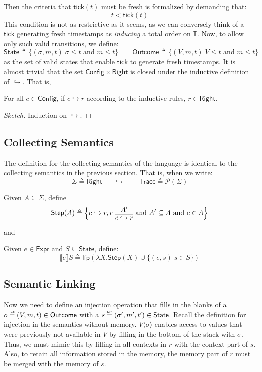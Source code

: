 \documentclass[acmsmall,screen,review]{acmart}\settopmatter{printfolios=true,printccs=false,printacmref=false}
\theoremstyle{acmdefinition}
\newcommand*{\pset}{\mathcal{P}}
\newcommand*{\Expr}{\mathsf{Expr}}
\newcommand*{\Time}{\mathbb{T}}
\newcommand*{\ctx}{\sigma}
\newcommand*{\mem}{m}
\newcommand*{\Trace}{\mathsf{Trace}}
\newcommand*{\Config}{\mathsf{Config}}
\newcommand*{\config}{c}
\newcommand*{\Right}{\mathsf{Right}}
\newcommand*{\rightst}{r}
\newcommand*{\texteq}[1]{\stackrel{\mathclap{\tiny\normalfont\mbox{#1}}}{=}}
\newcommand*{\State}{\mathsf{State}}
\newcommand*{\Outcome}{\mathsf{Outcome}}
\newcommand*{\lfp}{\mathsf{lfp}}
\newcommand*{\semarrow}{\hookrightarrow}
\newcommand*{\sembracket}[1]{\lBrack{#1}\rBrack}
\newcommand*{\tick}{\mathsf{tick}}
\newcommand*{\inject}[2]{{#2}\langle{#1}\rangle}
\begin{document}
Then the criteria that $\tick(t)$ must be fresh is formalized by demanding that:
\[t < \tick(t)\]
This condition is not as restrictive as it seems, as we can conversely think of a $\tick$ generating fresh timestamps as \emph{inducing} a total order on $\Time$.
Now, to allow only such valid transitions, we define:
\[
  \State\triangleq\{(\ctx,\mem,t)|\ctx\le t\text{ and }\mem\le t\}\qquad
  \Outcome\triangleq\{(V,\mem,t)|V\le t\text{ and }\mem\le t\}
\]
as the set of valid states that enable $\tick$ to generate fresh timestamps.
It is almost trivial that the set $\Config\times\Right$ is closed under the inductive definition of $\semarrow$.
That is,
\begin{lemma}
  For all $\config\in\Config$, if $\config\semarrow\rightst$ according to the inductive rules, $\rightst\in\Right$.
\end{lemma}
\begin{proof}[Sketch]
  Induction on $\semarrow$.
\end{proof}

\subsection{Collecting Semantics}
The definition for the collecting semantics of the language is identical to the collecting semantics in the previous section.
That is, when we write:
\[\Sigma\triangleq\Right\:+\:\semarrow\qquad\Trace\triangleq\pset(\Sigma)\]
\begin{definition}
  Given $A\subseteq \Sigma$, define
  \[
    \mathsf{Step}(A)\triangleq
    \left\{\config\semarrow\rightst, \rightst\middle|
    \begin{prooftree}[center=true]
      \hypo{A'}\infer1{\config\semarrow\rightst}
    \end{prooftree}\text{ and }
    A'\subseteq A\text{ and }\config\in A
    \right\}
  \]
\end{definition}
and
\begin{definition}
  Given $e\in\Expr$ and $S\subseteq\State$, define:
  \[
    \sembracket{e}S\triangleq\lfp(\lambda X.\mathsf{Step}(X)\cup\{(e,s)|s\in S\})
  \]
\end{definition}
\subsection{Semantic Linking}
Now we need to define an injection operation that fills in the blanks of a $o\texteq{let}(V,\mem,t)\in\Outcome$ with a $s\texteq{let}(\ctx',\mem',t')\in\State$.
Recall the definition for injection in the semantics without memory.
$\inject{\ctx}{V}$ enables access to values that were previously not available in $V$ by filling in the bottom of the stack with $\ctx$.
Thus, we must mimic this by filling in all contexts in $r$ with the context part of $s$.
Also, to retain all information stored in the memory, the memory part of $r$ must be merged with the memory of $s$.
\end{document}
